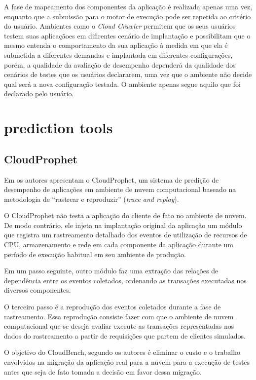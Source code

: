 A fase de mapeamento dos componentes da aplicação é realizada apenas uma vez, enquanto que a submissão para o motor de execução pode ser repetida ao critério do usuário. Ambientes como o {\em Cloud Crawler} permitem que os seus usuários testem suas aplicaçãoes em difirentes cenário de implantação e possibilitam que o mesmo entenda o comportamento da sua aplicação à medida em que ela é submetida a diferentes demandas e implantada em diferentes configurações, porém, a qualidade da avaliação de desempenho dependerá da qualidade dos cenários de testes que os usuários declararem, uma vez que o ambiente não decide qual será a nova configuração testada. O ambiente apenas segue aquilo que foi declarado pelo usuário.   

\section{prediction tools}
\subsection{CloudProphet}
Em \cite{li2011cloudprophet} os autores apresentam o CloudProphet, um sistema de
predição de desempenho de aplicações em ambiente de nuvem computacional baseado 
na metodologia de ``rastrear e reproduzir'' (\textit{trace and replay}).

O CloudProphet não testa a aplicação do cliente de fato no ambiente de nuvem. De
modo contrário, ele injeta na implantação original da aplicação um módulo que 
registra um rastreamento detalhado dos eventos de utilização de recursos de CPU,
armazenamento e rede em cada componente da aplicação durante um período de 
execução habitual em seu ambiente de produção.

Em um passo seguinte, outro módulo faz uma extração das relações de dependência 
entre os eventos coletados, ordenando as transações executadas nos diversos 
componentes.

O terceiro passo é a reprodução dos eventos coletados durante a fase de 
rastreamento. Essa reprodução consiste fazer com que o ambiente de nuvem 
computacional que se deseja avaliar execute as transações representadas nos dados
do rastreamento a partir de requisições que partem de clientes simulados.
   
O objetivo do CloudBench, segundo os autores é eliminar o custo e o trabalho 
envolvidos na migração da aplicação real para a nuvem para a execução de testes 
antes que seja de fato tomada a decisão em favor dessa migração.

